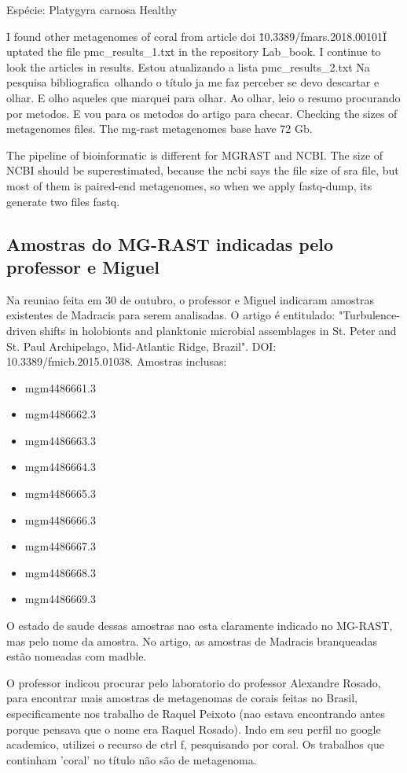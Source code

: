 \documentclass[12pt, a4paper]{report}
\begin{document}
Espécie: Platygyra carnosa
Healthy

I found other metagenomes of coral from article\: doi \"10.3389/fmars.2018.00101\"
I uptated the file pmc\_results\_1.txt in the repository Lab\_book. I continue to look the articles in results. 
Estou atualizando a lista pmc\_results\_2.txt
Na pesquisa bibliografica\, olhando o título ja me faz perceber se devo descartar e olhar. E olho aqueles que marquei para olhar. Ao olhar, leio o resumo procurando por metodos.  E vou para os metodos do artigo para checar.
Checking the sizes of metagenomes files. The mg-rast metagenomes base have 72 Gb. 

The pipeline of bioinformatic is different for MG\-RAST and NCBI.
The size of NCBI should be superestimated, because the ncbi says the file size of sra file, but most of them is paired-end metagenomes, so when we apply fastq-dump, its generate two files fastq. 

\subsection{Amostras do MG-RAST indicadas pelo professor e Miguel}
Na reuniao feita em 30 de outubro, o professor e Miguel indicaram amostras existentes de Madracis para serem analisadas. O artigo é entitulado: "Turbulence-driven shifts in holobionts and planktonic microbial assemblages in St. Peter and St. Paul Archipelago, Mid-Atlantic Ridge, Brazil". DOI: 10.3389/fmicb.2015.01038. Amostras inclusas: 
\begin{itemize}
\item mgm4486661.3
\item mgm4486662.3
\item mgm4486663.3
\item mgm4486664.3
\item mgm4486665.3
\item mgm4486666.3
\item mgm4486667.3
\item mgm4486668.3
\item mgm4486669.3
\end{itemize}
O estado de saude dessas amostras nao esta claramente indicado no MG-RAST, mas pelo nome da amostra. No artigo, as amostras de Madracis branqueadas estão nomeadas com madble.

O professor indicou procurar pelo laboratorio do professor Alexandre Rosado, para encontrar mais amostras de metagenomas de corais feitas no Brasil, especificamente nos trabalho de Raquel Peixoto (nao estava encontrando antes porque pensava que o nome era Raquel Rosado). Indo em seu perfil no google academico, utilizei o recurso de ctrl f, pesquisando por coral. Os trabalhos que continham 'coral' no título não são de metagenoma. 
\end{document}
